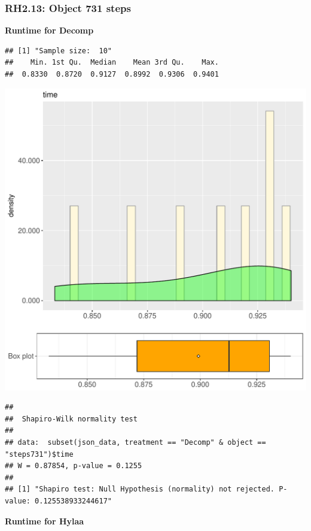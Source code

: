 \documentclass{article}\usepackage[]{graphicx}\usepackage[]{color}
\makeatletter
\def\maxwidth{ %
  \ifdim\Gin@nat@width>\linewidth
    \linewidth
  \else
    \Gin@nat@width
  \fi
}
\newenvironment{kframe}{%
 \def\at@end@of@kframe{}%
 \ifinner\ifhmode%
  \def\at@end@of@kframe{\end{minipage}}%
  \begin{minipage}{\columnwidth}%
 \fi\fi%
 \def\FrameCommand##1{\hskip\@totalleftmargin \hskip-\fboxsep
 \colorbox{shadecolor}{##1}\hskip-\fboxsep
     \hskip-\linewidth \hskip-\@totalleftmargin \hskip\columnwidth}%
 \MakeFramed {\advance\hsize-\width
   \@totalleftmargin\z@ \linewidth\hsize
   \@setminipage}}%
 {\par\unskip\endMakeFramed%
 \at@end@of@kframe}
\newenvironment{knitrout}{}{} %
\makeatother
\begin{document}
\subsubsection{RH2.13: Object 731 steps}

 \textbf{Runtime for Decomp}
\begin{knitrout}
\color{fgcolor}\begin{kframe}
\begin{verbatim}
## [1] "Sample size:  10"
##    Min. 1st Qu.  Median    Mean 3rd Qu.    Max. 
##  0.8330  0.8720  0.9127  0.8992  0.9306  0.9401
\end{verbatim}
\end{kframe}
\includegraphics[width=\maxwidth]{figure/RH2_Decomp_steps731-1} 
\begin{kframe}\begin{verbatim}
## 
## 	Shapiro-Wilk normality test
## 
## data:  subset(json_data, treatment == "Decomp" & object == "steps731")$time
## W = 0.87854, p-value = 0.1255
## 
## [1] "Shapiro test: Null Hypothesis (normality) not rejected. P-value: 0.125538933244617"
\end{verbatim}
\end{kframe}
\end{knitrout}
 \textbf{Runtime for Hylaa}
\end{document}
